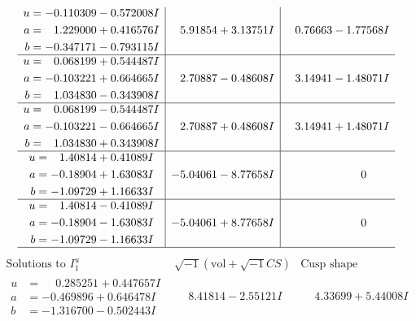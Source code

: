 \documentclass[1p]{elsarticle_modified}
\theoremstyle{definition}
\newcommand{\I}{\sqrt{-1}}
\begin{document}
$$\begin{array}{c|c|c}
\begin{aligned}
u &= -0.110309 - 0.572008 I \\
a &= \phantom{-}1.229000 + 0.416576 I \\
b &= -0.347171 - 0.793115 I\end{aligned}
 & \phantom{-}5.91854 + 3.13751 I & \phantom{-}0.76663 - 1.77568 I \\ \hline\begin{aligned}
u &= \phantom{-}0.068199 + 0.544487 I \\
a &= -0.103221 + 0.664665 I \\
b &= \phantom{-}1.034830 - 0.343908 I\end{aligned}
 & \phantom{-}2.70887 - 0.48608 I & \phantom{-}3.14941 - 1.48071 I \\ \hline\begin{aligned}
u &= \phantom{-}0.068199 - 0.544487 I \\
a &= -0.103221 - 0.664665 I \\
b &= \phantom{-}1.034830 + 0.343908 I\end{aligned}
 & \phantom{-}2.70887 + 0.48608 I & \phantom{-}3.14941 + 1.48071 I \\ \hline\begin{aligned}
u &= \phantom{-}1.40814 + 0.41089 I \\
a &= -0.18904 + 1.63083 I \\
b &= -1.09729 + 1.16633 I\end{aligned}
 & -5.04061 - 8.77658 I & \phantom{-0.000000 } 0 \\ \hline\begin{aligned}
u &= \phantom{-}1.40814 - 0.41089 I \\
a &= -0.18904 - 1.63083 I \\
b &= -1.09729 - 1.16633 I\end{aligned}
 & -5.04061 + 8.77658 I & \phantom{-0.000000 } 0\\
 \hline 
 \end{array}$$\newpage$$\begin{array}{c|c|c}  
\text{Solutions to }I^u_{1}& \I (\text{vol} + \sqrt{-1}CS) & \text{Cusp shape}\\
 \hline 
\begin{aligned}
u &= \phantom{-}0.285251 + 0.447657 I \\
a &= -0.469896 + 0.646478 I \\
b &= -1.316700 - 0.502443 I\end{aligned}
 & \phantom{-}8.41814 - 2.55121 I & \phantom{-}4.33699 + 5.44008 I \\ \hline\begin{aligned}

\end{aligned}
\end{array}$$
\end{document}
